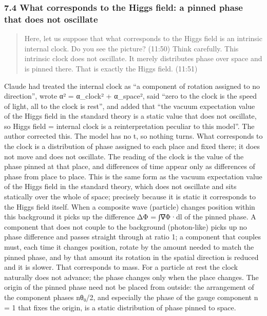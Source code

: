 \documentclass[
  a4paper,
]{article}
\begin{document}
\subsubsection{7.4 What corresponds to the Higgs field: a pinned phase
that does not
oscillate}\label{what-corresponds-to-the-higgs-field-a-pinned-phase-that-does-not-oscillate}

\begin{quote}
Here, let us suppose that what corresponds to the Higgs field is an
intrinsic internal clock. Do you see the picture? (11:50) Think
carefully. This intrinsic clock does not oscillate. It merely
distributes phase over space and is pinned there. That is exactly the
Higgs field. (11:51)
\end{quote}

Claude had treated the internal clock as ``a component of rotation
assigned to no direction'', wrote α² = α\_clock² + α\_space², said
``zero to the clock is the speed of light, all to the clock is rest'',
and added that ``the vacuum expectation value of the Higgs field in the
standard theory is a static value that does not oscillate, so Higgs
field = internal clock is a reinterpretation peculiar to this model''.
The author corrected this. The model has no t, so nothing turns. What
corresponds to the clock is a distribution of phase assigned to each
place and fixed there; it does not move and does not oscillate. The
reading of the clock is the value of the phase pinned at that place, and
differences of time appear only as differences of phase from place to
place. This is the same form as the vacuum expectation value of the
Higgs field in the standard theory, which does not oscillate and sits
statically over the whole of space; precisely because it is static it
corresponds to the Higgs field itself. When a composite wave (particle)
changes position within this background it picks up the difference ΔΦ =
∫∇Φ·dl of the pinned phase. A component that does not couple to the
background (photon-like) picks up no phase difference and passes
straight through at ratio 1; a component that couples must, each time it
changes position, rotate by the amount needed to match the pinned phase,
and by that amount its rotation in the spatial direction is reduced and
it is slower. That corresponds to mass. For a particle at rest the clock
naturally does not advance; the phase changes only when the place
changes. The origin of the pinned phase need not be placed from outside:
the arrangement of the component phases nθ₀/2, and especially the phase
of the gauge component n = 1 that fixes the origin, is a static
distribution of phase pinned to space.
\end{document}
